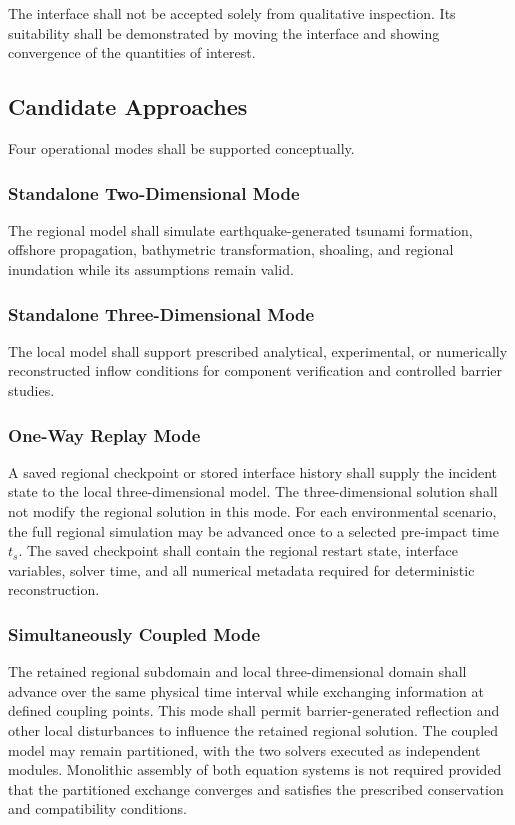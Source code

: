 The interface shall not be accepted solely from qualitative inspection.
Its suitability shall be demonstrated by moving the interface and
showing convergence of the quantities of interest.

\subsection{Candidate Approaches}
\label{sec:res-mod-mul-candidate-approaches}


Four operational modes shall be supported conceptually.

\subsubsection{Standalone Two-Dimensional Mode}
\label{sec:res-mod-mul-mode-two-dimensional}
The regional model shall simulate earthquake-generated tsunami formation, offshore propagation, bathymetric transformation, shoaling, and regional inundation while its assumptions remain valid.

\subsubsection{Standalone Three-Dimensional Mode}
\label{sec:res-mod-mul-mode-three-dimensional}
The local model shall support prescribed analytical, experimental, or numerically reconstructed inflow conditions for component verification and controlled barrier studies.

\subsubsection{One-Way Replay Mode}
\label{sec:res-mod-mul-mode-one-way}
A saved regional checkpoint or stored interface history shall supply the incident state to the local three-dimensional model. The three-dimensional solution shall not modify the regional solution in this mode. For each environmental scenario, the full regional simulation may be advanced once to a selected pre-impact time $t_s$. The saved checkpoint shall contain the regional restart state, interface variables, solver time, and all numerical metadata required for deterministic reconstruction.

\subsubsection{Simultaneously Coupled Mode}
\label{sec:res-mod-mul-mode-simultaneous}
The retained regional subdomain and local three-dimensional domain shall advance over the same physical time interval while exchanging information at defined coupling points. This mode shall permit barrier-generated reflection and other local disturbances to influence the retained regional solution. The coupled model may remain partitioned, with the two solvers executed as independent modules. Monolithic assembly of both equation systems is not required provided that the partitioned exchange converges and satisfies the prescribed conservation and compatibility conditions.

